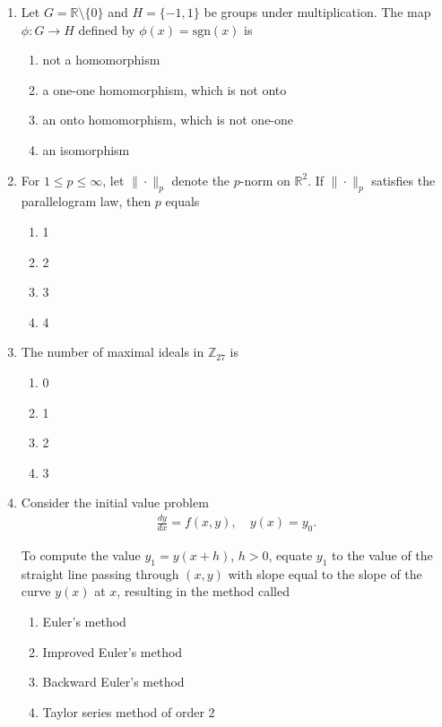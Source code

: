 \documentclass[journal]{IEEEtran}
\numberwithin{equation}{enumi}
\numberwithin{figure}{enumi}
\begin{document}
\begin{enumerate}
\item Let \(G = \mathbb{R} \setminus \{0\}\) and \(H = \{-1,1\}\) be groups under multiplication. The map \(\phi : G \to H\) defined by \(\phi(x) = \mathrm{sgn}(x)\) is
\hfill{}

\begin{enumerate}
\item not a homomorphism
\item a one-one homomorphism, which is not onto
\item an onto homomorphism, which is not one-one
\item an isomorphism
\end{enumerate}


\item For \(1 \leq p \leq \infty\), let \(\|\cdot\|_p\) denote the \(p\)-norm on \(\mathbb{R}^2\). If \(\|\cdot\|_p\) satisfies the parallelogram law, then \(p\) equals
\hfill{}
\begin{multicols}{4}
\begin{enumerate}
\item 1
\item 2
\item 3
\item 4
\end{enumerate}
\end{multicols}

\item The number of maximal ideals in \(\mathbb{Z}_{27}\) is
\hfill{}
\begin{multicols}{4}
\begin{enumerate}
\item 0
\item 1
\item 2
\item 3
\end{enumerate}
\end{multicols}

\item Consider the initial value problem
\begin{align}
    \frac{dy}{dx} = f(x,y), \quad y(x) = y_0.
\end{align}


To compute the value \(y_1 = y(x+h)\), \(h>0\), equate \(y_1\) to the value of the straight line passing through \((x,y)\) with slope equal to the slope of the curve \(y(x)\) at \(x\), resulting in the method called
\hfill{}
\begin{multicols}{2}
\begin{enumerate}
\item Euler's method
\item Improved Euler's method
\item Backward Euler's method
\item Taylor series method of order 2
\end{enumerate}
\end{multicols}




\end{enumerate}
\end{document}
